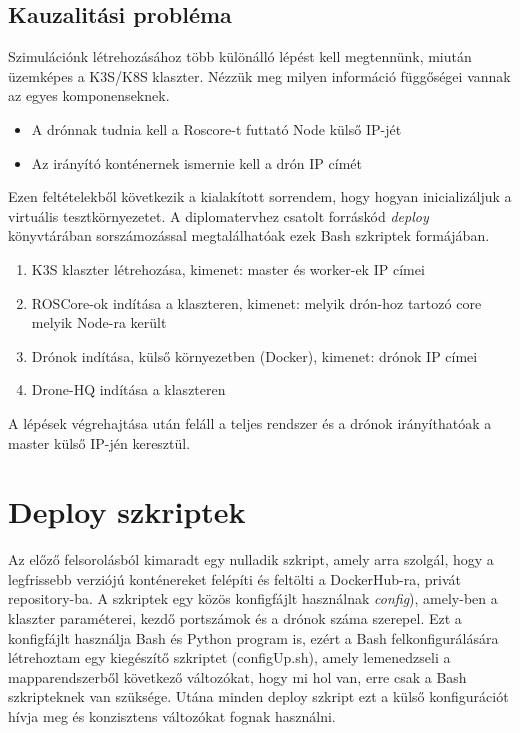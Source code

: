 \subsection{Kauzalitási probléma}
Szimulációnk létrehozásához több különálló lépést kell megtennünk, miután üzemképes a K3S/K8S klaszter. Nézzük meg milyen információ függőségei vannak az egyes komponenseknek.
\begin{itemize}
	\item A drónnak tudnia kell a Roscore-t futtató Node külső IP-jét
	\item Az irányító konténernek ismernie kell a drón IP címét
\end{itemize}

\noindent
Ezen feltételekből következik a kialakított sorrendem, hogy hogyan inicializáljuk a virtuális tesztkörnyezetet. A diplomatervhez csatolt forráskód \emph{deploy} könyvtárában sorszámozással megtalálhatóak ezek Bash szkriptek formájában.

\begin{enumerate}
	\item K3S klaszter létrehozása, kimenet: master és worker-ek IP címei
	\item ROSCore-ok indítása a klaszteren, kimenet: melyik drón-hoz tartozó core melyik Node-ra került
	\item Drónok indítása, külső környezetben (Docker), kimenet: drónok IP címei
	\item Drone-HQ indítása a klaszteren
\end{enumerate}
A lépések végrehajtása után feláll a teljes rendszer és a drónok irányíthatóak a master külső IP-jén keresztül.

\section{Deploy szkriptek}
Az előző felsorolásból kimaradt egy nulladik szkript, amely arra szolgál, hogy a legfrissebb verziójú konténereket felépíti és feltölti a DockerHub-ra, privát repository-ba. A szkriptek egy közös konfigfájlt használnak \emph{config}), amely-ben a klaszter paraméterei, kezdő portszámok és a drónok száma szerepel. Ezt a konfigfájlt használja Bash és Python program is, ezért a Bash felkonfigurálására létrehoztam egy kiegészítő szkriptet (configUp.sh), amely lemenedzseli a mapparendszerből következő változókat, hogy mi hol van, erre csak a Bash szkripteknek van szüksége. Utána minden deploy szkript ezt a külső konfigurációt hívja meg és konzisztens változókat fognak használni. \\

